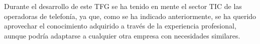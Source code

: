 Durante el desarrollo de este TFG se ha tenido en mente el sector TIC de las operadoras de telefonía, ya que, como se ha indicado anteriormente, se ha querido aprovechar el conocimiento adquirido a través de la experiencia profesional, aunque podría adaptarse a cualquier otra empresa con necesidades similares.

